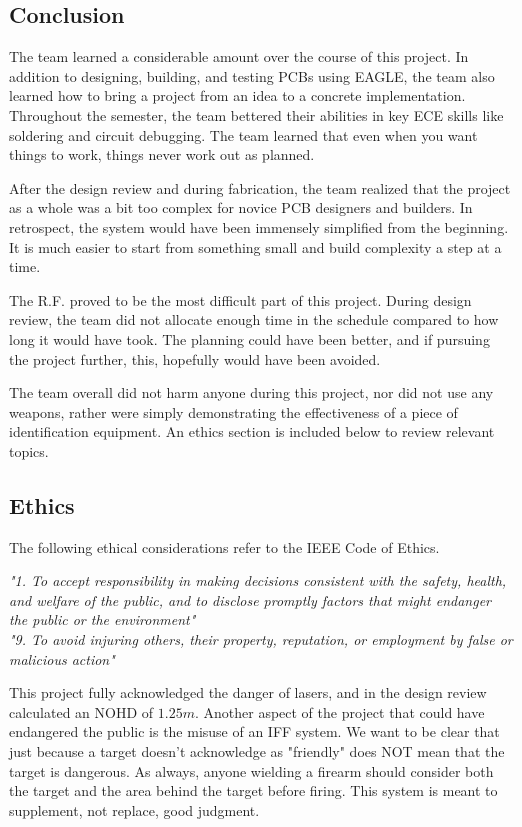 \documentclass[letterpaper,10pt]{article}
\begin{document}
\begin{spacing}{1.15}
\section{Conclusion}
The team learned a considerable amount over the course of this project. In addition to designing, building, and testing PCBs using EAGLE, the team also learned how to bring a project from an idea to a concrete implementation. Throughout the semester, the team bettered their abilities in key ECE skills like soldering and circuit debugging. The team learned that even when you want things to work, things never work out as planned. 

After the design review and during fabrication, the team realized that the project as a whole was a bit too complex for novice PCB designers and builders. In retrospect, the system would have been immensely simplified from the beginning. It is much easier to start from something small and build complexity a step at a time. 

The R.F. proved to be the most difficult part of this project. During design review, the team did not allocate enough time in the schedule compared to how long it would have took. The planning could have been better, and if pursuing the project further, this, hopefully would have been avoided.

The team overall did not harm anyone during this project, nor did not use any weapons, rather were simply demonstrating the effectiveness of a piece of identification equipment. An ethics section is included below to review relevant topics.

\subsection{Ethics}
The following ethical considerations refer to the IEEE Code of Ethics\cite{IEEE}.

\textit{"1. To accept responsibility in making decisions consistent with the safety, health, and welfare of the public, and to disclose promptly factors that might endanger the public or the environment"} \\
\textit{"9. To avoid injuring others, their property, reputation, or employment by false or malicious action"}

This project fully acknowledged the danger of lasers, and in the design review calculated an NOHD of $1.25m$. Another aspect of the project that could have endangered the public is the misuse of an IFF system. We want to be clear that just because a target doesn't acknowledge as "friendly" does NOT mean that the target is dangerous. As always, anyone wielding a firearm should consider both the target and the area behind the target before firing. This system is meant to supplement, not replace, good judgment.  


\end{spacing}
\end{document}
